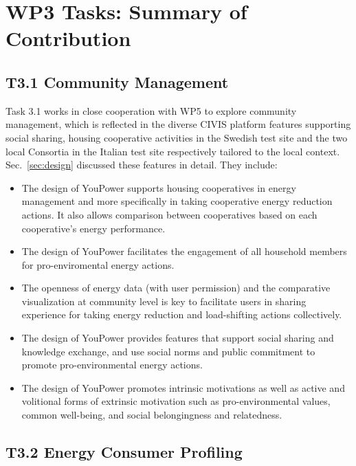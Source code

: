 \section{WP3 Tasks: Summary of Contribution}

\subsection{T3.1 Community Management}

Task 3.1 works in close cooperation with WP5 to explore community management, which is reflected in the diverse CIVIS platform features supporting social sharing, housing cooperative activities in the Swedish test site and the two local Consortia in the Italian test site respectively tailored to the local context. Sec.~\ref{sec:design} discussed these features in detail. They include:   

\begin{itemize}
\item The design of YouPower supports housing cooperatives in energy management and more specifically in taking cooperative energy reduction actions. It also allows comparison between cooperatives based on each cooperative's energy performance. 

\item The design of YouPower facilitates the engagement of all household members for pro-enviromental energy actions. 

\item The openness of energy data (with user permission) and the comparative visualization  at community level is key to facilitate users in sharing experience for taking energy reduction and load-shifting actions collectively. 

\item The design of YouPower provides features that support social sharing and knowledge exchange, and use social norms and public commitment to promote pro-environmental energy actions. 

\item The design of YouPower promotes intrinsic motivations as well as active and volitional forms of extrinsic motivation such as pro-environmental values, common well-being, and social belongingness and relatedness. 
\end{itemize}

\subsection{T3.2 Energy Consumer Profiling}

